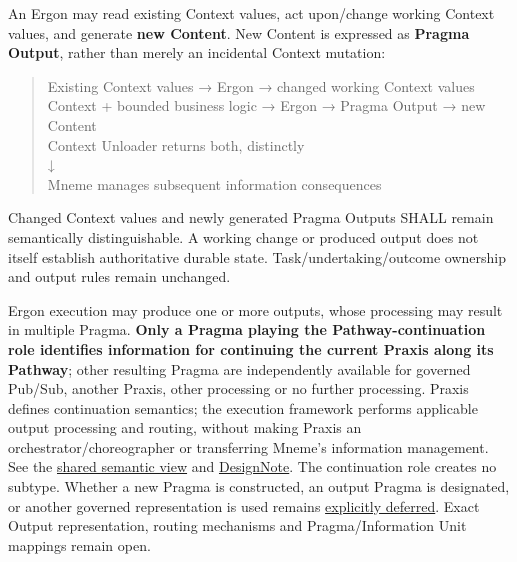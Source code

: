 An Ergon may read existing Context values, act upon/change working Context
values, and generate \textbf{new Content}. New Content is expressed as \textbf{Pragma
Output}, rather than merely an incidental Context mutation:



\begin{quote}\small\ttfamily
Existing Context values → Ergon → changed working Context values\\
Context + bounded business logic → Ergon → Pragma Output → new Content\\
                  Context Unloader returns both, distinctly\\
                                    ↓\\
                 Mneme manages subsequent information consequences\\

\end{quote}


Changed Context values and newly generated Pragma Outputs SHALL remain
semantically distinguishable. A working change or produced output does not
itself establish authoritative durable state. Task/undertaking/outcome ownership
and output rules remain unchanged.



Ergon execution may produce one or more outputs, whose processing may result in
multiple Pragma. \textbf{Only a Pragma playing the Pathway-continuation role identifies
information for continuing the current Praxis along its Pathway}; other resulting
Pragma are independently available for governed Pub/Sub, another Praxis, other
processing or no further processing. Praxis defines continuation semantics;
the execution framework performs applicable output processing and routing,
without making Praxis an orchestrator/choreographer or transferring Mneme's
information management. See the \hyperref[element:27ad143e7c784e378556af8a57c438f7]{shared semantic view}
and \href{\detokenize{../../../../../docs/markdown/05-information-systems-architecture/design-notes/DesignNote-Pragma-Outputs-and-Pathway-Continuation.md}}{DesignNote}.
The continuation role creates no subtype. Whether a new Pragma is constructed,
an output Pragma is designated, or another governed representation is used remains
\href{\detokenize{../../../../../docs/markdown/05-information-systems-architecture/gaps.md#continuation-representation}}{explicitly deferred}. Exact Output
representation, routing mechanisms and Pragma/Information Unit mappings remain open.



